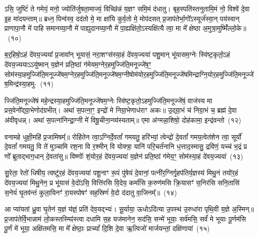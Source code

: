 ऽसि॒ जुष्टिं॑ ते गमेयं॒ मनो॒ ज्योति॑र्जुषता॒माज्यं॒ विच्छि॑न्नं य॒ज्ञꣳ समि॒मं द॑धातु। बृह॒स्पति॑स्तनुतामि॒मं नो॒ विश्वे॑ दे॒वा इ॒ह मा॑दयन्ताम्॥ ब्रध्न॒ पिन्व॑स्व॒ दद॑तो मे॒ मा क्षा॑यि कुर्व॒तो मे॒ मोप॑दसत् प्र॒जा\-प॑तेर्भा॒गो᳚\-ऽस्यूर्ज॑स्वा॒न् पय॑स्वान् प्राणापा॒नौ मे॑ पाहि समानव्या॒नौ मे॑ पाह्युदानव्या॒नौ मे॑ पा॒ह्यक्षि॑तो॒\-ऽस्यक्षि॑त्यै त्वा॒ मा मे᳚ क्षेष्ठा अ॒मुत्रा॒मुष्मिँ॑ल्लो॒के॥~(१०)

{\anuvakamend[{उ॒प॒ह॒वं जुष्टा॑ नस्त्वा॒ षट् च॑}]}%

ब॒र्॒\mbox{}हिषो॒\-ऽहं दे॑वय॒ज्यया᳚ प्र॒जावा᳚न् भूयासं॒ नरा॒शꣳस॑स्या॒हं दे॑वय॒ज्यया॑ पशु॒मान् भू॑यासम॒ग्नेः स्वि॑ष्ट॒कृतो॒\-ऽहं दे॑वय॒ज्यया\-ऽऽ\-यु॑ष्मान् य॒ज्ञेन॑ प्रति॒ष्ठां ग॑मेयम॒ग्ने\-र॒हमुज्जि॑ति॒\-मनूज्जे॑ष॒ꣳ॒ सोम॑\-स्या॒\-हमुज्जि॑ति॒\-मनूज्जे॑षम॒ग्नेर॒हमुज्जि॑ति॒\-मनूज्जे॑षम॒ग्नी\-षोम॑यो\-र॒ह\-मु\-ज्जि॑ति॒\-मनूज्जे॑ष\-मिन्द्राग्नि॒यो\-र॒हमुज्जि॑ति॒\-मनूज्जे॑ष॒\-मिन्द्र॑स्या॒हमु-~(११)

ज्जि॑ति॒मनूज्जे॑षं महे॒न्द्रस्या॒हमुज्जि॑ति॒\-मनूज्जे॑षम॒ग्नेः स्वि॑ष्ट॒कृतो॒\-ऽहमुज्जि॑ति॒मनूज्जे॑षं॒ वाज॑स्य मा प्रस॒वेनो᳚द्ग्रा॒भेणोद॑\-ग्रभीत्। अथा॑ स॒पत्ना॒ꣳ॒ इन्द्रो॑ मे निग्रा॒भेणाध॑राꣳ अकः॥ उ॒द्ग्रा॒भं च॑ निग्रा॒भं च॒ ब्रह्म॑ दे॒वा अ॑वीवृधन्न्। अथा॑ स॒पत्ना॑निन्द्रा॒ग्नी मे॑ विषू॒चीना॒न्व्य॑स्यताम्॥ एमा अ॑ग्मन्ना॒शिषो॒ दोह॑कामा॒ इन्द्र॑वन्तो~(१२)

वनामहे धुक्षी॒महि॑ प्र॒जामिषम्᳚॥ रोहि॑तेन त्वा॒\-ऽग्निर्दे॒वतां᳚ गमयतु॒ हरि॑भ्यां॒ त्वेन्द्रो॑ दे॒वतां᳚ गमय॒त्वेत॑शेन त्वा॒ सूर्यो॑ दे॒वतां᳚ गमयतु॒ वि ते॑ मुञ्चामि रश॒ना वि र॒श्मीन् वि योक्त्रा॒ यानि॑ परि॒चर्त॑नानि ध॒त्ताद॒स्मासु॒ द्रवि॑णं॒ यच्च॑ भ॒द्रं प्र णो᳚ ब्रूताद्भाग॒धान् दे॒वता॑सु॥ विष्णोः᳚ शं॒योर॒हं दे॑वय॒ज्यया॑ य॒ज्ञेन॑ प्रति॒ष्ठां ग॑मेय॒ꣳ॒ सोम॑स्या॒हं दे॑वय॒ज्यया॑~(१३)

सु॒रेता॒ रेतो॑ धिषीय॒ त्वष्टु॑र॒हं दे॑वय॒ज्यया॑ पशू॒नाꣳ रू॒पं पु॑षेयं दे॒वानां॒ पत्नी॑र॒ग्निर्गृ॒ह\-प॑तिर्य॒ज्ञस्य॑ मिथु॒नं तयो॑र॒हं दे॑वय॒ज्यया॑ मिथु॒नेन॒ प्र भू॑यासं वे॒दो॑\-ऽसि॒ वित्ति॑रसि वि॒देय॒ कर्मा॑सि क॒रुण॑मसि क्रि॒यासꣳ॑ स॒निर॑सि सनि॒तासि॑ स॒नेयं॑ घृ॒तव॑न्तं कुला॒यिनꣳ॑ रा॒यस्पोषꣳ॑ सह॒स्रिणं॑ वे॒दो द॑दातु वा॒जिनम्᳚॥~(१४)

{\anuvakamend[{इन्द्र॑स्या॒हमिन्द्र॑वन्तः॒ सोम॑स्या॒हं दे॑वय॒ज्यया॒ चतु॑श्चत्वारिꣳशच्च}]}%

आ प्या॑यतां ध्रु॒वा घृ॒तेन॑ य॒ज्ञं य॑ज्ञं॒ प्रति॑ देव॒यद्भ्यः॑। सू॒र्याया॒ ऊधो\-ऽदि॑त्या उ॒पस्थ॑ उ॒रुधा॑रा पृथि॒वी य॒ज्ञे अ॒स्मिन्॥ प्र॒जा\-प॑तेर्वि॒भान्नाम॑ लो॒कस्तस्मिꣴ॑स्त्वा दधामि स॒ह यज॑मानेन॒ सद॑सि॒ सन्मे॑ भूयाः॒ सर्व॑मसि॒ सर्वं॑ मे भूयाः पू॒र्णम॑सि पू॒र्णं मे॑ भूया॒ अक्षि॑तमसि॒ मा मे᳚ क्षेष्ठाः॒ प्राच्यां᳚ दि॒शि दे॒वा ऋ॒त्विजो॑ मार्जयन्तां॒ दक्षि॑णायां~(१५)

